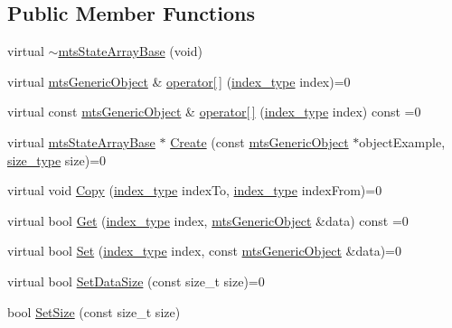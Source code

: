 \subsection*{Public Member Functions}
\begin{DoxyCompactItemize}
\item 
virtual \hyperlink{classmts_state_array_base_af6d2d84f3e93345b75c271e25a8d780a}{$\sim$mts\+State\+Array\+Base} (void)
\item 
virtual \hyperlink{classmts_generic_object}{mts\+Generic\+Object} \& \hyperlink{classmts_state_array_base_aa1da8c13184f5ebc5103e372d4a65ab5}{operator\mbox{[}$\,$\mbox{]}} (\hyperlink{classmts_state_array_base_a22ecbf65a907a7550951d12970f3df1d}{index\+\_\+type} index)=0
\item 
virtual const \hyperlink{classmts_generic_object}{mts\+Generic\+Object} \& \hyperlink{classmts_state_array_base_a7d8819d496a67a85e5288e5a4e1491a4}{operator\mbox{[}$\,$\mbox{]}} (\hyperlink{classmts_state_array_base_a22ecbf65a907a7550951d12970f3df1d}{index\+\_\+type} index) const =0
\item 
virtual \hyperlink{classmts_state_array_base}{mts\+State\+Array\+Base} $\ast$ \hyperlink{classmts_state_array_base_aedac123668b3ea43e5424de91bf2e03e}{Create} (const \hyperlink{classmts_generic_object}{mts\+Generic\+Object} $\ast$object\+Example, \hyperlink{classmts_state_array_base_a2a29f8b24a48620f67c907fc5592fc17}{size\+\_\+type} size)=0
\item 
virtual void \hyperlink{classmts_state_array_base_a257fc51f0fbe520338b6c6f301a9915f}{Copy} (\hyperlink{classmts_state_array_base_a22ecbf65a907a7550951d12970f3df1d}{index\+\_\+type} index\+To, \hyperlink{classmts_state_array_base_a22ecbf65a907a7550951d12970f3df1d}{index\+\_\+type} index\+From)=0
\item 
virtual bool \hyperlink{classmts_state_array_base_af325b729f2cd0e98372e5a3470734dc9}{Get} (\hyperlink{classmts_state_array_base_a22ecbf65a907a7550951d12970f3df1d}{index\+\_\+type} index, \hyperlink{classmts_generic_object}{mts\+Generic\+Object} \&data) const =0
\item 
virtual bool \hyperlink{classmts_state_array_base_a11b367be89abbbb96ed506764d0e676d}{Set} (\hyperlink{classmts_state_array_base_a22ecbf65a907a7550951d12970f3df1d}{index\+\_\+type} index, const \hyperlink{classmts_generic_object}{mts\+Generic\+Object} \&data)=0
\item 
virtual bool \hyperlink{classmts_state_array_base_a7a1ebd2697cdf0f4c709816a496ca3a8}{Set\+Data\+Size} (const size\+\_\+t size)=0
\item 
bool \hyperlink{classmts_state_array_base_ab4d09a9e4d7f6aa3d8703c1ce57b1b48}{Set\+Size} (const size\+\_\+t size)
\end{DoxyCompactItemize}
